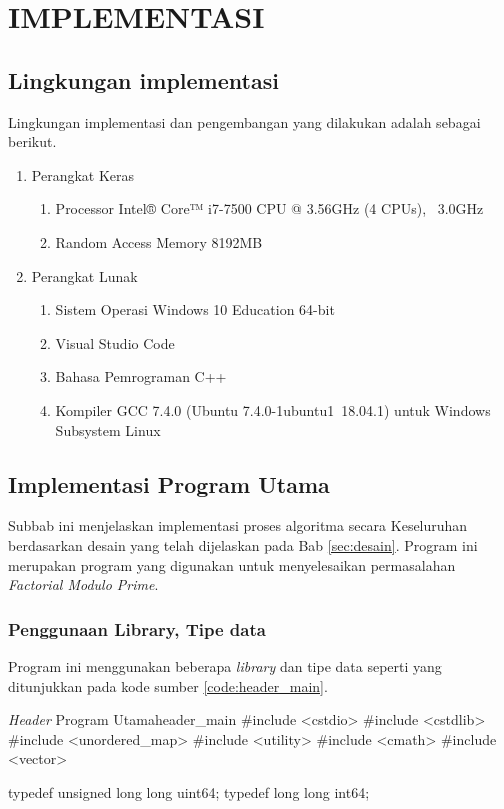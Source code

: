 \chapter {IMPLEMENTASI}

\section{Lingkungan implementasi}

Lingkungan implementasi dan pengembangan yang dilakukan adalah sebagai berikut.
\begin{enumerate}
	\item Perangkat Keras
	\begin{enumerate}
		\item Processor Intel® Core™ i7-7500 CPU @ 3.56GHz (4 CPUs), ~3.0GHz
		\item Random Access Memory 8192MB
	\end{enumerate}
	\item Perangkat Lunak
	\begin{enumerate}
		\item Sistem Operasi Windows 10 Education 64-bit
		\item Visual Studio Code
		\item Bahasa Pemrograman C++
		\item Kompiler GCC 7.4.0 (Ubuntu 7.4.0-1ubuntu1~18.04.1) untuk Windows Subsystem Linux
	\end{enumerate}
\end{enumerate}

\section{Implementasi Program Utama}

Subbab ini menjelaskan implementasi proses algoritma secara Keseluruhan berdasarkan desain yang telah dijelaskan pada Bab \ref{sec:desain}. Program ini merupakan program yang digunakan untuk menyelesaikan permasalahan \textit{Factorial Modulo Prime}.

\subsection{Penggunaan Library, Tipe data}

Program ini menggunakan beberapa \textit{library} dan tipe data seperti yang ditunjukkan pada kode sumber \ref{code:header_main}.

\begin{code}[firstnumber=1,float]{\textit{Header} Program Utama}{header_main}
#include <cstdio>
#include <cstdlib>
#include <unordered_map>
#include <utility>
#include <cmath>
#include <vector>

typedef unsigned long long uint64;
typedef          long long int64;
\end{code}

